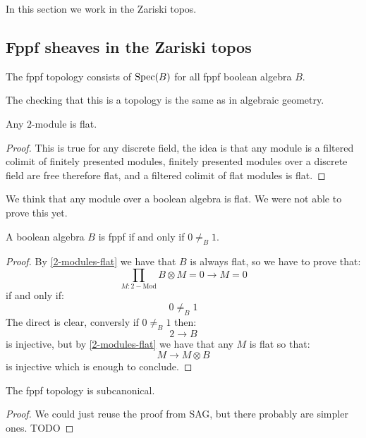 In this section we work in the Zariski topos.

\subsection{Fppf sheaves in the Zariski topos}

\begin{definition}
The fppf topology consists of $\operatorname{Spec}(B)$ for all fppf boolean algebra $B$.
\end{definition}

The checking that this is a topology is the same as in algebraic geometry.

\begin{lemma}\label{2-modules-flat}
Any $2$-module is flat.
\end{lemma}

\begin{proof}
This is true for any discrete field, the idea is that any module is a filtered colimit of finitely presented modules, finitely presented modules over a discrete field are free therefore flat, and a filtered colimit of flat modules is flat.
\end{proof}

\begin{remark}
We think that any module over a boolean algebra is flat. We were not able to prove this yet.
\end{remark}

\begin{lemma}
A boolean algebra $B$ is fppf if and only if $0\not=_B1$.
\end{lemma}

\begin{proof}
By \cref{2-modules-flat} we have that $B$ is always flat, so we have to prove that:
\[\prod_{M:2-\mathrm{Mod}} B\otimes M = 0 \to M=0\]
if and only if:
\[0\not=_B1\]
The direct is clear, conversly if $0\not=_B1$ then:
\[2\to B\]
is injective, but by \cref{2-modules-flat} we have that any $M$ is flat so that:
\[M\to M\otimes B\]
is injective which is enough to conclude.
\end{proof}

\begin{lemma}
The fppf topology is subcanonical.
\end{lemma}

\begin{proof}
We could just reuse the proof from SAG, but there probably are simpler ones. TODO
\end{proof}

